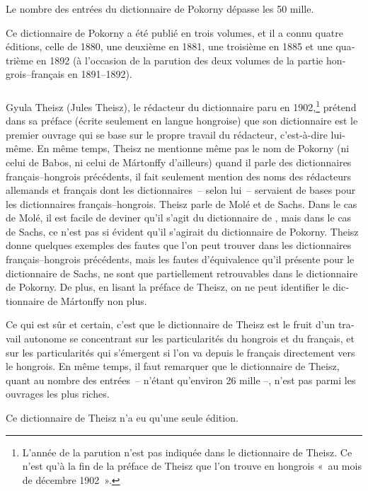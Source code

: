 \documentclass[output=paper,colorlinks,citecolor=brown,arabicfont,chinesefont,booklanguage=french]{langscibook}
\begin{document}
\begin{otherlanguage}{french}
Le nombre des entrées du dictionnaire de Pokorny dépasse les 50 mille.

Ce dictionnaire de Pokorny a été publié en trois volumes, et il a connu quatre éditions, celle de 1880, une deuxième en 1881, une troisième en 1885 et une quatrième en 1892 (à l’occasion de la parution des deux volumes de la partie hongrois–français en 1891–1892).

\subsubsection{\citealt{Theisz1902} }\label{sec:tillinger:2.1.4}

Gyula Theisz (Jules Theisz), le rédacteur du dictionnaire paru en 1902,\footnote{L’année de la parution n’est pas indiquée dans le dictionnaire de Theisz. Ce n’est qu’à la fin de la préface de Theisz que l’on trouve en hongrois «~au mois de décembre 1902~».} prétend dans sa préface (écrite seulement en langue hongroise) que son dictionnaire est le premier ouvrage qui se base sur le propre travail du rédacteur, c’est-à-dire lui-même. En même temps, Theisz ne mentionne même pas le nom de Pokorny (ni celui de Babos, ni celui de Mártonffy d’ailleurs) quand il parle des dictionnaires français–hongrois précédents, il fait seulement mention des noms des rédacteurs allemands et français dont les dictionnaires~-- selon lui~-- servaient de bases pour les dictionnaires français–hongrois. Theisz parle de Molé et de Sachs. Dans le cas de Molé, il est facile de deviner qu’il s’agit du dictionnaire de \citet{Babos1865}, mais dans le cas de Sachs, ce n’est pas si évident qu’il s’agirait du dictionnaire de Pokorny. Theisz donne quelques exemples des fautes que l’on peut trouver dans les dictionnaires français–hongrois précédents, mais les fautes d’équivalence qu’il présente pour le dictionnaire de Sachs, ne sont que partiellement retrouvables dans le dictionnaire de Pokorny.  De plus, en lisant la préface de Theisz, on ne peut identifier le dictionnaire de Mártonffy non plus.

Ce qui est sûr et certain, c’est que le dictionnaire de Theisz est le fruit d’un travail autonome se concentrant sur les particularités du hongrois et du français, et sur les particularités qui s’émergent si l’on va depuis le français directement vers le hongrois. En même temps, il faut remarquer que le dictionnaire de Theisz, quant au nombre des entrées~-- n’étant qu’environ 26 mille –, n’est pas parmi les ouvrages les plus riches. 

Ce dictionnaire de Theisz n’a eu qu’une seule édition.


\end{otherlanguage}
\end{document}
